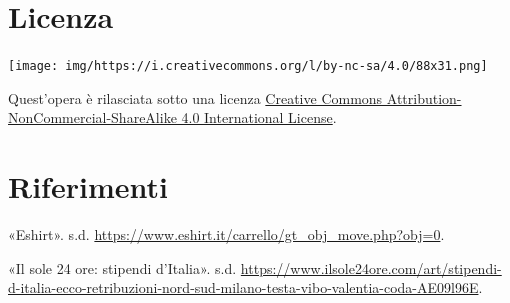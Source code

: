 \documentclass[12pt,italian,]{report}
\begin{document}
\hypertarget{licenza}{%
\chapter{Licenza}\label{licenza}}

\texttt{[image: img/https://i.creativecommons.org/l/by-nc-sa/4.0/88x31.png]}

Quest'opera è rilasciata sotto una licenza
\href{https://creativecommons.org/licenses/by-nc-sa/4.0/}{Creative
Commons Attribution-NonCommercial-ShareAlike 4.0 International License}.

\hypertarget{riferimenti}{%
\chapter*{Riferimenti}\label{riferimenti}}

\hypertarget{refs}{}
\leavevmode\hypertarget{ref-eshirt}{}%
«Eshirt». s.d.
\url{https://www.eshirt.it/carrello/gt_obj_move.php?obj=0}.

\leavevmode\hypertarget{ref-redditomedio}{}%
«Il sole 24 ore: stipendi d'Italia». s.d.
\url{https://www.ilsole24ore.com/art/stipendi-d-italia-ecco-retribuzioni-nord-sud-milano-testa-vibo-valentia-coda-AE09l96E}.
\end{document}
